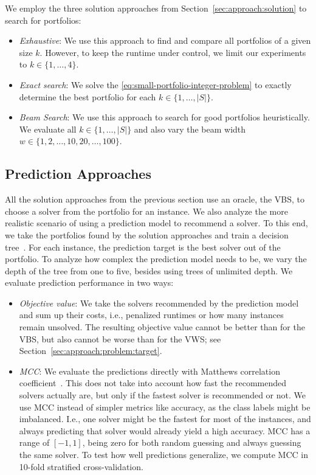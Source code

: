\documentclass[conference]{IEEEtran}
\begin{document}
We employ the three solution approaches from Section~\ref{sec:approach:solution} to search for portfolios:

\begin{itemize}
	\item \emph{Exhaustive}:
	We use this approach to find and compare all portfolios of a given size $k$.
	However, to keep the runtime under control, we limit our experiments to $k \in \{1, \dots, 4\}$.
	\item \emph{Exact search}:
	We solve the \ref{eq:small-portfolio-integer-problem} to exactly determine the best portfolio for each $k \in \{1, \dots, |S|\}$.
	\item \emph{Beam Search}:
	We use this approach to search for good portfolios heuristically.
	We evaluate all $k \in \{1, \dots, |S|\}$ and also vary the beam width $w \in \{1, 2, \dots, 10, 20, \dots, 100\}$.
\end{itemize}

\subsection{Prediction Approaches}

All the solution approaches from the previous section use an oracle, the VBS, to choose a solver from the portfolio for an instance.
We also analyze the more realistic scenario of using a prediction model to recommend a solver.
To this end, we take the portfolios found by the solution approaches and train a decision tree~\cite{breiman1984classification}.
For each instance, the prediction target is the best solver out of the portfolio.
To analyze how complex the prediction model needs to be, we vary the depth of the tree from one to five, besides using trees of unlimited depth.
We evaluate prediction performance in two ways:

\begin{itemize}
	\item \emph{Objective value}:
	We take the solvers recommended by the prediction model and sum up their costs, i.e., penalized runtimes or how many instances remain unsolved.
	The resulting objective value cannot be better than for the VBS, but also cannot be worse than for the VWS; see Section~\ref{sec:approach:problem:target}.
	\item \emph{MCC}:
	We evaluate the predictions directly with Matthews correlation coefficient~\cite{matthews1975comparison, gorodkin2004comparing}.
	This does not take into account how fast the recommended solvers actually are, but only if the fastest solver is recommended or not.
	We use MCC instead of simpler metrics like accuracy, as the class labels might be imbalanced.
	I.e., one solver might be the fastest for most of the instances, and always predicting that solver would already yield a high accuracy.
	MCC has a range of $[-1,1]$, being zero for both random guessing and always guessing the same solver.
	To test how well predictions generalize, we compute MCC in 10-fold stratified cross-validation.
\end{itemize}
\end{document}
